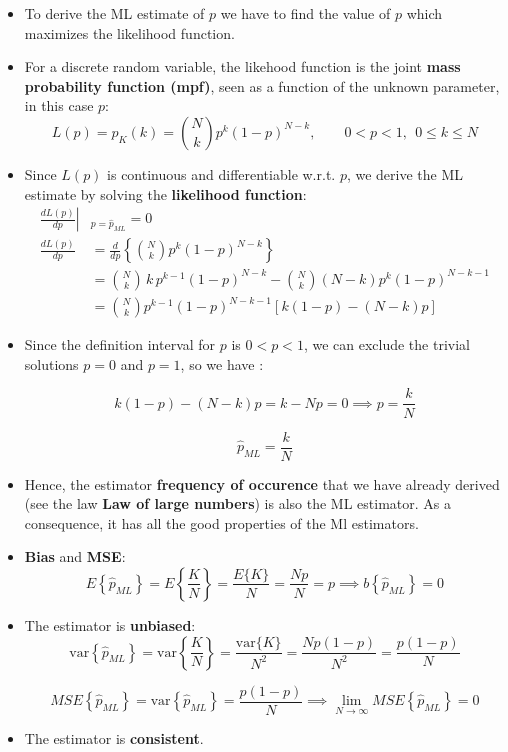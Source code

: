 \begin{itemize}
    \item To derive the ML estimate of \(p\) we have to find the value of \(p\) which maximizes the likelihood function.
    \item For a discrete random variable, the likehood function is the joint \textbf{mass probability function (mpf)}, seen as a function of the unknown parameter, in this case \(p\):
    $$
    L(p) = p_K(k) = \binom{N}{k} p^k (1-p)^{N-k}, \qquad 0 < p < 1, \ \ 0 \leq k    \leq N
    $$
    \item Since \(L(p)\) is continuous and differentiable w.r.t. \(p\), we derive the ML estimate by solving the \textbf{likelihood function}:
    \[
    \begin{aligned}
    \left. \frac{dL(p)}{dp} \right|&_{p = \hat{p}_{ML}} = 0\\[5pt]
    \frac{dL(p)}{dp} &= \frac{d}{dp} \left\{ \binom{N}{k} p^k (1-p)^{N-k} \right\}\\[5pt]
    &= \binom{N}{k} \, k \, p^{k-1} (1-p)^{N-k} - \binom{N}{k} (N-k) p^k (1-p)^{N-k-1}\\[5pt]
    &= \binom{N}{k} p^{k-1} (1-p)^{N-k-1} \left[ k(1-p) - (N-k)p \right]
    \end{aligned}
    \]
    \item Since the definition interval for \(p\) is \(0<p<1\), we can exclude the trivial solutions \(p=0\) and \(p=1\), so we have :

$$
k(1 - p) - (N - k)p = k - Np = 0 \implies p = \frac{k}{N}
$$

$$
\boxed{\hat{p}_{ML} = \frac{k}{N}}
$$

\item Hence, the estimator \textbf{frequency of occurence} that we have already derived (see the law \textbf{Law of large numbers}) is also the ML estimator. As a consequence, it has all the good properties of the Ml estimators.
    \item \textbf{Bias} and \textbf{MSE}:
$$
E\left\{ \hat{p}_{ML} \right\} = E\left\{ \frac{K}{N} \right\} = \frac{E\{K\}}{N} = \frac{N p}{N} = p \implies b\left\{ \hat{p}_{ML} \right\} = 0
$$


    \item The estimator is \textbf{unbiased}:
$$
\mathrm{var}\left\{ \hat{p}_{ML} \right\} = \mathrm{var}\left\{ \frac{K}{N} \right\} = \frac{\mathrm{var}\{K\}}{N^2} = \frac{N p (1-p)}{N^2} = \frac{p(1-p)}{N}
$$

$$
MSE\left\{ \hat{p}_{ML} \right\} = \mathrm{var}\left\{ \hat{p}_{ML} \right\} = \frac{p(1-p)}{N} \implies \lim_{N \to \infty} MSE\left\{ \hat{p}_{ML} \right\} = 0
$$


    \item The estimator is \textbf{consistent}.
\end{itemize}
